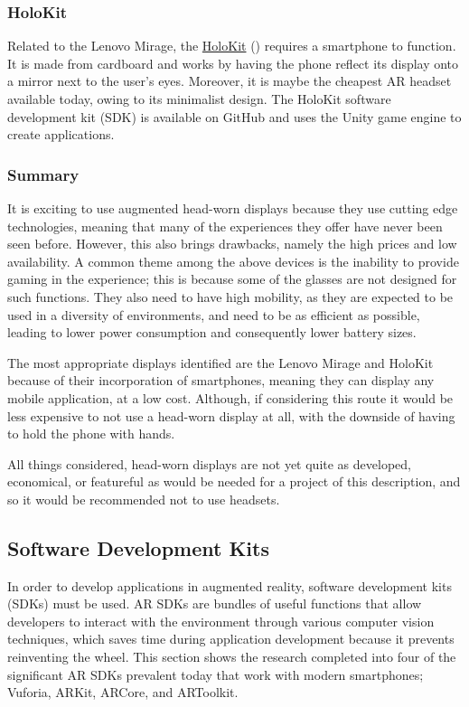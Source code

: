 \subsubsection{HoloKit}
Related to the Lenovo Mirage, the \href{https://holokit.io}{HoloKit} (\citeyear{holokit}) requires a smartphone to function. It is made from cardboard and works by having the phone reflect its display onto a mirror next to the user's eyes. Moreover, it is maybe the cheapest AR headset available today, owing to its minimalist design. The HoloKit software development kit (SDK) is available on GitHub and uses the Unity game engine to create applications.

\subsubsection{Summary}
It is exciting to use augmented head-worn displays because they use cutting edge technologies, meaning that many of the experiences they offer have never been seen before.  However, this also brings drawbacks, namely the high prices and low availability. A common theme among the above devices is the inability to provide gaming in the experience; this is because some of the glasses are not designed for such functions. They also need to have high mobility, as they are expected to be used in a diversity of environments, and need to be as efficient as possible, leading to lower power consumption and consequently lower battery sizes. 

The most appropriate displays identified are the Lenovo Mirage and HoloKit because of their incorporation of smartphones, meaning they can display any mobile application, at a low cost. Although, if considering this route it would be less expensive to not use a head-worn display at all, with the downside of having to hold the phone with hands.

All things considered, head-worn displays are not yet quite as developed, economical, or featureful as would be needed for a project of this description, and so it would be recommended not to use headsets.


\subsection{Software Development Kits}

In order to develop applications in augmented reality, software development kits (SDKs) must be used. AR SDKs are bundles of useful functions that allow developers to interact with the environment through various computer vision techniques, which saves time during application development because it prevents reinventing the wheel. This section shows the research completed into four of the significant AR SDKs prevalent today that work with modern smartphones; Vuforia, ARKit, ARCore, and ARToolkit.

